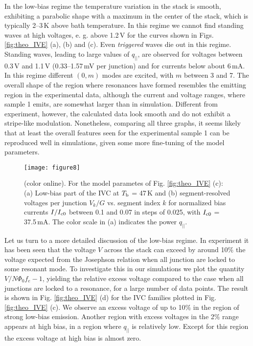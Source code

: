 \documentclass[aps,twocolumn,prb,showpacs,preprintnumbers,superscriptaddress,amsmath,amssymb,longbibliography]{revtex4-1}
\begin{document}
In the low-bias regime the temperature variation in the stack is smooth, exhibiting a parabolic shape with a maximum in the center of the stack, which is typically 2--3\,K above bath temperature. In this regime we cannot find standing waves at high voltages, e. g. above 1.2\,V for the curves shown in Figs. \ref{fig:theo_IVE} (a), (b) and (c). Even \textit{triggered} waves die out in this regime. Standing waves, leading to large values of $q_{||}$, are observed for voltages between 0.3\,V and 1.1\,V (0.33--1.57\,mV per junction) and for currents below about 6\,mA. In this regime different $(0,m)$ modes are excited, with $m$ between 3 and 7. 
The overall shape of the region where resonances have formed resembles the emitting region in the experimental data, although the current and voltage ranges, where sample 1 emits, are somewhat larger than in simulation. Different from experiment, however, the calculated data look smooth and do not exhibit a stripe-like modulation. 
Nonetheless, comparing all three graphs, it seems likely that at least the overall features seen for the experimental sample 1 can be reproduced well in simulations, given some more fine-tuning of the model parameters. 

\begin{figure}[b]
\texttt{[image: figure8]}
\caption{(color online). For the model parametes  of Fig. \ref{fig:theo_IVE} (c): (a) Low-bias part of the IVC at $T_{\rm b}$ = 47\,K and (b) segment-resolved voltages per junction $V_k/G$ vs. segment index $k$ for normalized bias currents $I/I_{\rm c0}$ between 0.1 and 0.07 in steps of 0.025, with $I_{\rm c0}$ = 37.5\,mA. The color scale in (a) indicates the power $q_{||}$. 
}
\label{fig:Vexcess}
\end{figure}

Let us turn to a more detailed discussion of the low-bias regime. In experiment it has been seen that the voltage $V$ across the stack can exceed by around 10$\%$ the voltage expected from the Josephson relation when all junction are locked to some resonant mode. To investigate this in our simulations we plot the quantity $V/N\Phi_0f_e - 1$, yielding the relative excess voltage compared to the case when all junctions are locked to a resonance, for a large number of data points. The result is shown in Fig. \ref{fig:theo_IVE} (d) for the IVC families plotted in Fig. \ref{fig:theo_IVE} (c). We observe an excess voltage of up to 10$\%$ in the region of strong low-bias emission. Another region with excess voltages in the 2$\%$  range appears at high bias, in a region where $q_{||}$ is relatively low. Except for this region the excess voltage at high bias is almost zero.
\end{document}
